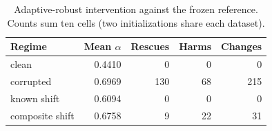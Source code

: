 \begin{table}[ht]\centering\small
\caption{Adaptive-robust intervention against the frozen reference. Counts sum ten cells (two initializations share each dataset).}
\begin{tabular}{lrrrr}\toprule Regime & Mean $\alpha$ & Rescues & Harms & Changes \\\midrule
clean & 0.4410 & 0 & 0 & 0 \\
corrupted & 0.6969 & 130 & 68 & 215 \\
known shift & 0.6094 & 0 & 0 & 0 \\
composite shift & 0.6758 & 9 & 22 & 31 \\
\bottomrule\end{tabular}\end{table}
